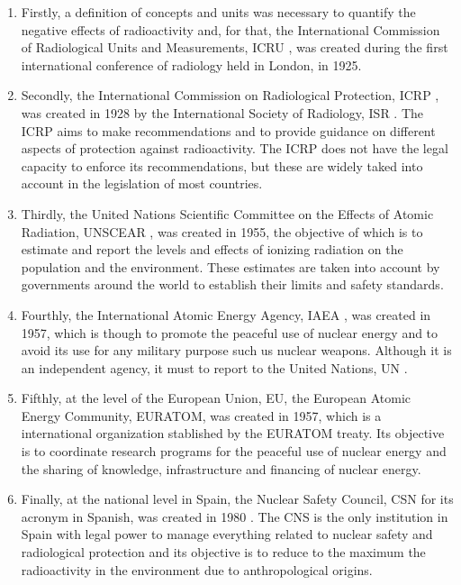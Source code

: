 \begin{enumerate}
\item{} Firstly, a definition of concepts and units was necessary to quantify the negative effects of radioactivity and, for that, the International Commission of Radiological Units and Measurements, ICRU \cite{ICRU}, was created during the first international conference of radiology held in London, in 1925.

\item{} Secondly, the International Commission on Radiological Protection, ICRP \cite{ICRP}, was created in 1928 by the International Society of Radiology, ISR \cite{ISR}. The ICRP aims to make recommendations and to provide guidance on different aspects of protection against radioactivity. The ICRP does not have the legal capacity to enforce its recommendations, but these are widely taked into account in the legislation of most countries. %

\item{} Thirdly, the United Nations Scientific Committee on the Effects of Atomic Radiation, UNSCEAR \cite{UNSCEAR}, was created in 1955, the objective of which is to estimate and report the levels and effects of ionizing radiation on the population and the environment. These estimates are taken into account by governments around the world to establish their limits and safety standards.

\item{} Fourthly, the International Atomic Energy Agency, IAEA \cite{IAEA}, was created in 1957, which is though to promote the peaceful use of nuclear energy and to avoid its use for any military purpose such us nuclear weapons. Although it is an independent agency, it must to report to the United Nations, UN \cite{UN}.

\item{} Fifthly, at the level of the European Union, EU, the European Atomic Energy Community, EURATOM, was created in 1957, which is a international organization stablished by the EURATOM treaty. Its objective is to coordinate research programs for the peaceful use of nuclear energy and the sharing of knowledge, infrastructure and financing of nuclear energy.

\item{} Finally, at the national level in Spain, the Nuclear Safety Council, CSN for its acronym in Spanish, was created in 1980 \cite{CSN}. The CNS is the only institution in Spain with legal power to manage everything related to nuclear safety and radiological protection and its objective is to reduce to the maximum the radioactivity in the environment due to anthropological origins.


\end{enumerate}
